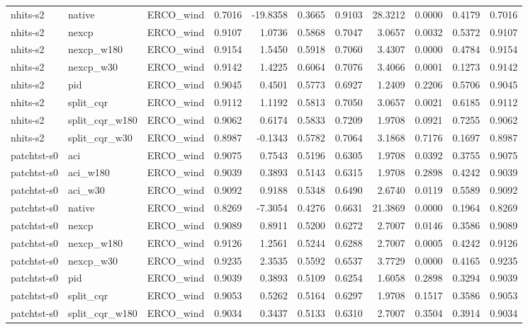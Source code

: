 \begin{tabular}{lllrrrrrrrr}
nhits-s2 & native & ERCO_wind & 0.7016 & -19.8358 & 0.3665 & 0.9103 & 28.3212 & 0.0000 & 0.4179 & 0.7016 \\
nhits-s2 & nexcp & ERCO_wind & 0.9107 & 1.0736 & 0.5868 & 0.7047 & 3.0657 & 0.0032 & 0.5372 & 0.9107 \\
nhits-s2 & nexcp_w180 & ERCO_wind & 0.9154 & 1.5450 & 0.5918 & 0.7060 & 3.4307 & 0.0000 & 0.4784 & 0.9154 \\
nhits-s2 & nexcp_w30 & ERCO_wind & 0.9142 & 1.4225 & 0.6064 & 0.7076 & 3.4066 & 0.0001 & 0.1273 & 0.9142 \\
nhits-s2 & pid & ERCO_wind & 0.9045 & 0.4501 & 0.5773 & 0.6927 & 1.2409 & 0.2206 & 0.5706 & 0.9045 \\
nhits-s2 & split_cqr & ERCO_wind & 0.9112 & 1.1192 & 0.5813 & 0.7050 & 3.0657 & 0.0021 & 0.6185 & 0.9112 \\
nhits-s2 & split_cqr_w180 & ERCO_wind & 0.9062 & 0.6174 & 0.5833 & 0.7209 & 1.9708 & 0.0921 & 0.7255 & 0.9062 \\
nhits-s2 & split_cqr_w30 & ERCO_wind & 0.8987 & -0.1343 & 0.5782 & 0.7064 & 3.1868 & 0.7176 & 0.1697 & 0.8987 \\
patchtst-s0 & aci & ERCO_wind & 0.9075 & 0.7543 & 0.5196 & 0.6305 & 1.9708 & 0.0392 & 0.3755 & 0.9075 \\
patchtst-s0 & aci_w180 & ERCO_wind & 0.9039 & 0.3893 & 0.5143 & 0.6315 & 1.9708 & 0.2898 & 0.4242 & 0.9039 \\
patchtst-s0 & aci_w30 & ERCO_wind & 0.9092 & 0.9188 & 0.5348 & 0.6490 & 2.6740 & 0.0119 & 0.5589 & 0.9092 \\
patchtst-s0 & native & ERCO_wind & 0.8269 & -7.3054 & 0.4276 & 0.6631 & 21.3869 & 0.0000 & 0.1964 & 0.8269 \\
patchtst-s0 & nexcp & ERCO_wind & 0.9089 & 0.8911 & 0.5200 & 0.6272 & 2.7007 & 0.0146 & 0.3586 & 0.9089 \\
patchtst-s0 & nexcp_w180 & ERCO_wind & 0.9126 & 1.2561 & 0.5244 & 0.6288 & 2.7007 & 0.0005 & 0.4242 & 0.9126 \\
patchtst-s0 & nexcp_w30 & ERCO_wind & 0.9235 & 2.3535 & 0.5592 & 0.6537 & 3.7729 & 0.0000 & 0.4165 & 0.9235 \\
patchtst-s0 & pid & ERCO_wind & 0.9039 & 0.3893 & 0.5109 & 0.6254 & 1.6058 & 0.2898 & 0.3294 & 0.9039 \\
patchtst-s0 & split_cqr & ERCO_wind & 0.9053 & 0.5262 & 0.5164 & 0.6297 & 1.9708 & 0.1517 & 0.3586 & 0.9053 \\
patchtst-s0 & split_cqr_w180 & ERCO_wind & 0.9034 & 0.3437 & 0.5133 & 0.6310 & 2.7007 & 0.3504 & 0.3914 & 0.9034 \\

\end{tabular}
